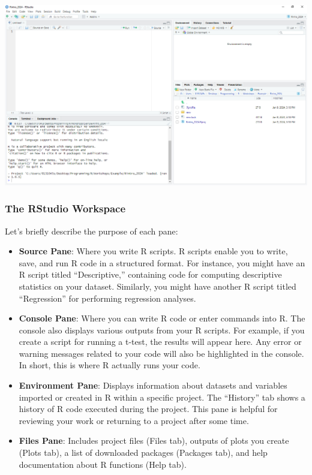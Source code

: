 \documentclass[
]{book}
\begin{document}
\includegraphics{img/01-four-panes.png}

\subsubsection{The RStudio Workspace}\label{the-rstudio-workspace}

Let's briefly describe the purpose of each pane:

\begin{itemize}
\item
  \textbf{Source Pane}: Where you write R scripts. R scripts enable you to write, save, and run R code in a structured format. For instance, you might have an R script titled ``Descriptive,'' containing code for computing descriptive statistics on your dataset. Similarly, you might have another R script titled ``Regression'' for performing regression analyses.
\item
  \textbf{Console Pane}: Where you can write R code or enter commands into R. The console also displays various outputs from your R scripts. For example, if you create a script for running a t-test, the results will appear here. Any error or warning messages related to your code will also be highlighted in the console. In short, this is where R actually runs your code.
\item
  \textbf{Environment Pane}: Displays information about datasets and variables imported or created in R within a specific project. The ``History'' tab shows a history of R code executed during the project. This pane is helpful for reviewing your work or returning to a project after some time.
\item
  \textbf{Files Pane}: Includes project files (Files tab), outputs of plots you create (Plots tab), a list of downloaded packages (Packages tab), and help documentation about R functions (Help tab).
\end{itemize}
\end{document}

